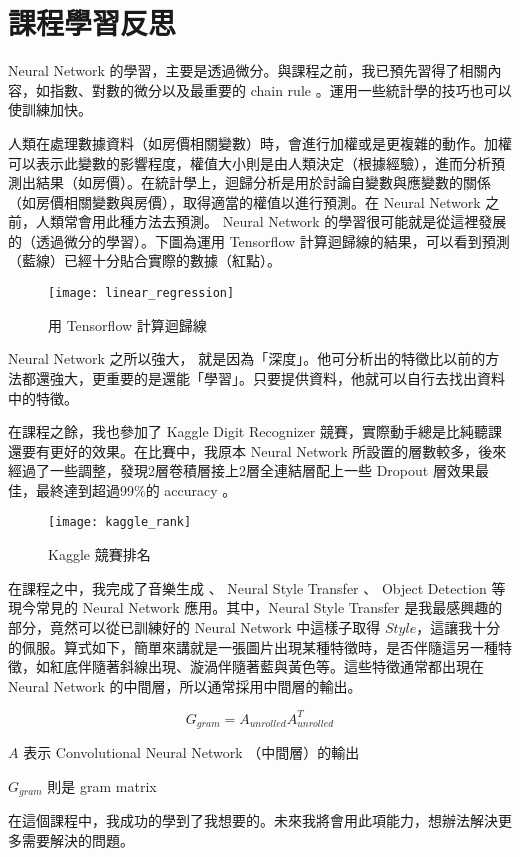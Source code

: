 \chapter*{課程學習反思}
Neural Network 的學習，主要是透過微分。與課程之前，我已預先習得了相關內容，如指數、對數的微分以及最重要的 chain rule 。運用一些統計學的技巧也可以使訓練加快。

人類在處理數據資料（如房價相關變數）時，會進行加權或是更複雜的動作。加權可以表示此變數的影響程度，權值大小則是由人類決定（根據經驗），進而分析預測出結果（如房價）。在統計學上，迴歸分析是用於討論自變數與應變數的關係（如房價相關變數與房價），取得適當的權值以進行預測。在 Neural Network 之前，人類常會用此種方法去預測。 Neural Network 的學習很可能就是從這裡發展的（透過微分的學習）。下圖為運用 Tensorflow 計算迴歸線的結果，可以看到預測（藍線）已經十分貼合實際的數據（紅點）。

\begin{figure}[H]
    \centering
    \caption{用 Tensorflow 計算迴歸線}
    \texttt{[image: linear\_regression]}
\end{figure}



Neural Network 之所以強大， 就是因為「深度」。他可分析出的特徵比以前的方法都還強大，更重要的是還能「學習」。只要提供資料，他就可以自行去找出資料中的特徵。

在課程之餘，我也參加了 Kaggle Digit Recognizer 競賽，實際動手總是比純聽課還要有更好的效果。在比賽中，我原本 Neural Network 所設置的層數較多，後來經過了一些調整，發現2層卷積層接上2層全連結層配上一些 Dropout 層效果最佳，最終達到超過99\%的 accuracy 。

\begin{figure}[H]
    \centering
    \caption{Kaggle 競賽排名}
    \texttt{[image: kaggle\_rank]}
\end{figure}


在課程之中，我完成了音樂生成 、 Neural Style Transfer 、 Object Detection 等現今常見的 Neural Network 應用。其中，Neural Style Transfer 是我最感興趣的部分，竟然可以從已訓練好的 Neural Network 中這樣子取得 $ Style $，這讓我十分的佩服。算式如下，簡單來講就是一張圖片出現某種特徵時，是否伴隨這另一種特徵，如紅底伴隨著斜線出現、漩渦伴隨著藍與黃色等。這些特徵通常都出現在 Neural Network 的中間層，所以通常採用中間層的輸出。

\[
    G_{gram} = A_{unrolled} A^{T}_{unrolled}
\]

\begin{center}
    $ A $ 表示 Convolutional Neural Network （中間層）的輸出

    $ G_{gram} $ 則是 gram matrix 
\end{center}

在這個課程中，我成功的學到了我想要的。未來我將會用此項能力，想辦法解決更多需要解決的問題。
